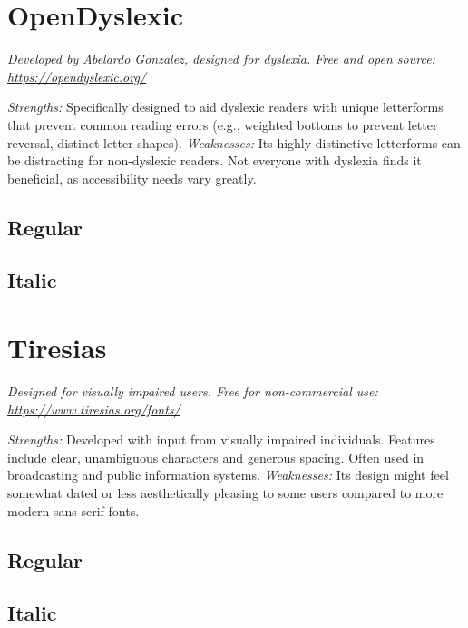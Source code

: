 \pagebreak
\section{OpenDyslexic}\label{sec:opendyslexic}
\emph{Developed by Abelardo Gonzalez, designed for dyslexia. Free and open source: \url{https://opendyslexic.org/}}
\begin{raggedright}
\emph{Strengths:} Specifically designed to aid dyslexic readers with unique letterforms that prevent common reading errors (e.g., weighted bottoms to prevent letter reversal, distinct letter shapes).
\emph{Weaknesses:} Its highly distinctive letterforms can be distracting for non-dyslexic readers. Not everyone with dyslexia finds it beneficial, as accessibility needs vary greatly.

\subsection{Regular}
\FontSample{\opendyslexicfont}

\subsection{Italic}
\FontSample{{\opendyslexicfont\itshape}}
\end{raggedright}


\pagebreak
\section{Tiresias}\label{sec:tiresias}
\emph{Designed for visually impaired users. Free for non-commercial use: \url{https://www.tiresias.org/fonts/}}
\begin{raggedright}
\emph{Strengths:} Developed with input from visually impaired individuals. Features include clear, unambiguous characters and generous spacing. Often used in broadcasting and public information systems.
\emph{Weaknesses:} Its design might feel somewhat dated or less aesthetically pleasing to some users compared to more modern sans-serif fonts.

\subsection{Regular}
\FontSample{\tiresiasfont}

\subsection{Italic}
\FontSample{{\tiresiasfont\itshape}}
\end{raggedright}


